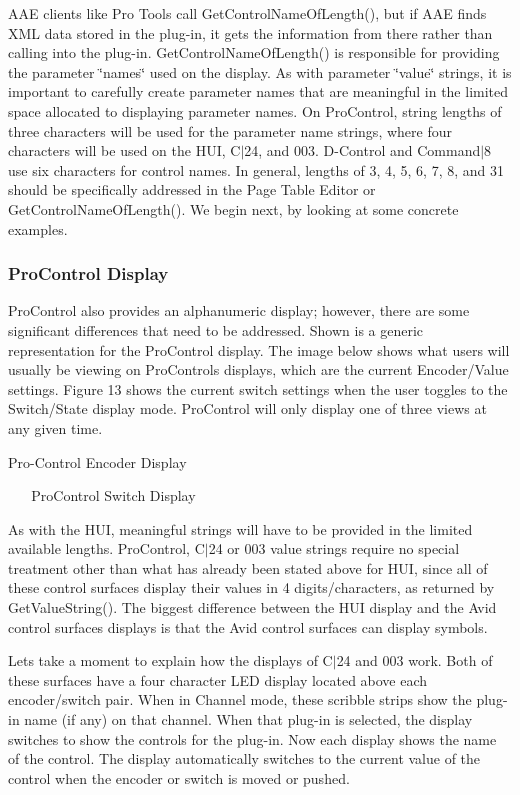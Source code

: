 A\+AE clients like Pro Tools call Get\+Control\+Name\+Of\+Length(), but if A\+AE finds X\+ML data stored in the plug-\/in, it gets the information from there rather than calling into the plug-\/in. Get\+Control\+Name\+Of\+Length() is responsible for providing the parameter \char`\"{}names\char`\"{} used on the display. As with parameter \char`\"{}value\char`\"{} strings, it is important to carefully create parameter names that are meaningful in the limited space allocated to displaying parameter names. On Pro\+Control, string lengths of three characters will be used for the parameter name strings, where four characters will be used on the H\+UI, C$\vert$24, and 003. D-\/\+Control and Command$\vert$8 use six characters for control names. In general, lengths of 3, 4, 5, 6, 7, 8, and 31 should be specifically addressed in the Page Table Editor or Get\+Control\+Name\+Of\+Length(). We begin next, by looking at some concrete examples.

\hypertarget{a00833_subsection_procontrol_display}{}\subsubsection{Pro\+Control Display}\label{a00833_subsection_procontrol_display}
Pro\+Control also provides an alphanumeric display; however, there are some significant differences that need to be addressed. Shown is a generic representation for the Pro\+Control display. The image below shows what users will usually be viewing on Pro\+Control\textquotesingle{}s displays, which are the current Encoder/\+Value settings. Figure 13 shows the current switch settings when the user toggles to the Switch/\+State display mode. Pro\+Control will only display one of three views at any given time.

  Pro-\/\+Control Encoder Display

~ ~   Pro\+Control Switch Display

As with the H\+UI, meaningful strings will have to be provided in the limited available lengths. Pro\+Control, C$\vert$24 or 003 value strings require no special treatment other than what has already been stated above for H\+UI, since all of these control surfaces display their values in 4 digits/characters, as returned by {\ttfamily Get\+Value\+String()}. The biggest difference between the H\+UI display and the Avid control surfaces\textquotesingle{} displays is that the Avid control surfaces can display symbols.

Let\textquotesingle{}s take a moment to explain how the displays of C$\vert$24 and 003 work. Both of these surfaces have a four character L\+ED display located above each encoder/switch pair. When in Channel mode, these scribble strips show the plug-\/in name (if any) on that channel. When that plug-\/in is selected, the display switches to show the controls for the plug-\/in. Now each display shows the name of the control. The display automatically switches to the current value of the control when the encoder or switch is moved or pushed. 

